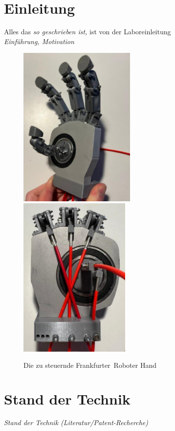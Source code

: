\documentclass[a4paper,12pt,final]{article} %
\numberwithin{equation}{section} %
\numberwithin{figure}{section} %
\numberwithin{table}{section} %
\begin{document}
\section[Einleitung ]{Einleitung} 
Alles das \emph{so geschrieben ist, } ist von der Laboreinleitung\\
\emph{Einführung, Motivation}
\begin{figure}[H]
	\begin{center}
		\includegraphics[height=8cm]{Bilder/RoboHandVorne.png}
		\vspace{0.5cm}
		\includegraphics[height=8cm]{Bilder/RoboHandHinten.png}
		\label{fig:RoboHand}
		\caption{Die zu steuernde \glqq Frankfurter\grqq\ Roboter Hand}
	\end{center}
\end{figure}
\newpage
\section{Stand der Technik}
\emph{Stand der Technik (Literatur/Patent-Recherche)}
\end{document}
